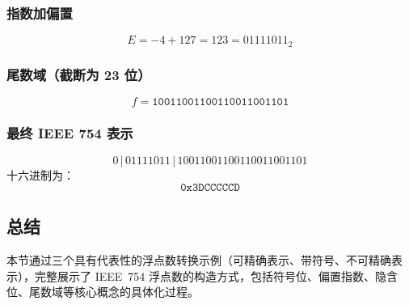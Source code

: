 \subsubsection*{指数加偏置}
\[
E = -4 + 127 = 123 = 01111011_2
\]

\subsubsection*{尾数域（截断为 23 位）}
\[
f = \texttt{10011001100110011001101}
\]

\subsubsection*{最终 IEEE 754 表示}
\[
0 \,|\, 01111011 \,|\, 10011001100110011001101
\]
十六进制为：
\[
\texttt{0x3DCCCCCD}
\]

\subsection{总结}

本节通过三个具有代表性的浮点数转换示例（可精确表示、带符号、不可精确表示），完整展示了 IEEE~754 浮点数的构造方式，包括符号位、偏置指数、隐含位、尾数域等核心概念的具体化过程。































